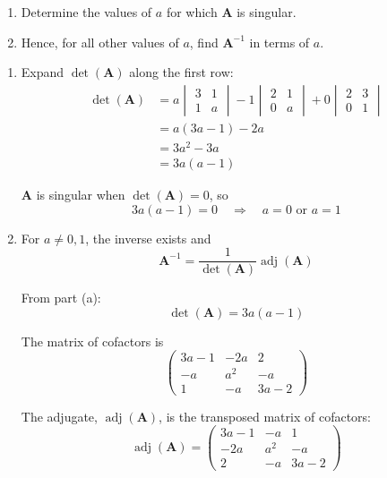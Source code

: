 \documentclass[leqno]{article}
\begin{document}
\begin{enumerate}[
  label=\textbf{\arabic*.},
  leftmargin=*,
  topsep=0pt,
  partopsep=0pt,
  parsep=0pt
]
\begin{enumerate}[label=\textbf{(\alph*)}]
  \item Determine the values of $a$ for which $\mathbf{A}$ is singular.  \\
  \item Hence, for all other values of $a$, find $\mathbf{A}^{-1}$ in terms of $a$.  \\
\end{enumerate}

\vspace*{10pt}

\begin{djsSolution}
\begin{enumerate}[label=\textbf{(\alph*)}]
  \item Expand $\det(\mathbf{A})$ along the first row:
  \begin{align*}
  \det(\mathbf{A})
  &=a\begin{vmatrix}3&1\\[2pt]1&a\end{vmatrix}
  -1\begin{vmatrix}2&1\\[2pt]0&a\end{vmatrix}
  +0\begin{vmatrix}2&3\\[2pt]0&1\end{vmatrix}\\
  &=a(3a-1)-2a\\
  &=3a^2-3a\\
  &=3a(a-1)
  \end{align*}

  $\mathbf{A}$ is singular when $\det(\mathbf{A})=0$, so
  \[
  3a(a-1)=0\quad\Longrightarrow\quad a=0 \text{ or } a=1
  \]

  \item For $a\neq 0,1$, the inverse exists and
  \[
  \mathbf{A}^{-1}=\frac{1}{\det(\mathbf{A})}\operatorname{adj}(\mathbf{A})
  \]

  From part (a):
  \[
  \det(\mathbf{A})=3a(a-1)
  \]

  The matrix of cofactors is
  \[
  \begin{pmatrix}
  3a-1 & -2a & 2\\
  -a & a^2 & -a\\
  1 & -a & 3a-2
  \end{pmatrix}
  \]

  The adjugate, \(\operatorname{adj}(\mathbf{A})\), is the transposed matrix of cofactors:
  \[
  \operatorname{adj}(\mathbf{A})=
  \begin{pmatrix}
  3a-1 & -a & 1\\
  -2a & a^2 & -a\\
  2 & -a & 3a-2
  \end{pmatrix}
  \]


\end{enumerate}
\end{djsSolution}
\end{enumerate}
\end{document}
